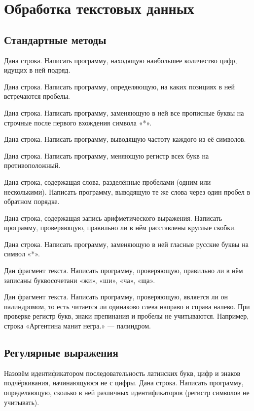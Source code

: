 \section{Обработка текстовых данных}

\subsection{Стандартные методы}

\task Дана строка. Написать программу, находящую наибольшее количество
цифр, идущих в ней подряд.

\task Дана строка. Написать программу, определяющую, на каких позициях
в ней встречаются пробелы.

\task Дана строка. Написать программу, заменяющую в ней все прописные
буквы на строчные после первого вхождения символа «*».

\task Дана строка. Написать программу, выводящую частоту каждого из её
символов.

\task Дана строка. Написать программу, меняющую регистр всех букв на
противоположный.

\task Дана строка, содержащая слова, разделённые пробелами (одним или
несколькими). Написать программу, выводящую те же слова через один
пробел в обратном порядке.

\task Дана строка, содержащая запись арифметического
выражения. Написать программу, проверяющую, правильно ли в нём
расставлены круглые скобки.

\task Дана строка. Написать программу, заменяющую в ней гласные
русские буквы на символ «*».

\task Дан фрагмент текста. Написать программу, проверяющую, правильно
ли в нём записаны буквосочетани «жи», «ши», «ча», «ща».

\task Дан фрагмент текста. Написать программу, проверяющую, является
ли он палиндромом, то есть читается ли одинаково слева направо и
справа налево. При проверке регистр букв, знаки препинания и пробелы
не учитываются. Например, строка «Аргентина манит негра.» — палиндром.

\subsection{Регулярные выражения}

\task Назовём идентификатором последовательность латинских букв, цифр
и знаков подчёркивания, начинающуюся не с цифры. Дана строка. Написать
программу, определяющую, сколько в ней различных идентификаторов
(регистр символов не учитывать).

